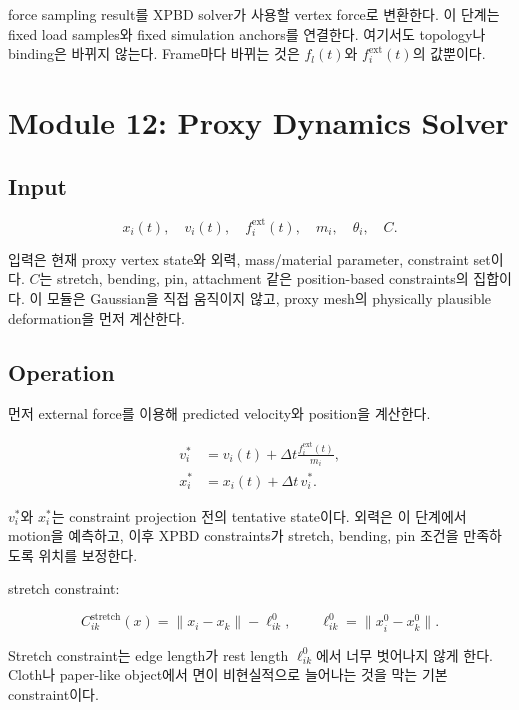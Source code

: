 \documentclass[11pt,a4paper]{article}
\begin{document}
force sampling result를 XPBD solver가 사용할 vertex force로 변환한다. 이 단계는 fixed load samples와 fixed simulation anchors를 연결한다.
여기서도 topology나 binding은 바뀌지 않는다.
Frame마다 바뀌는 것은 $f_l(t)$와 $f_i^{\mathrm{ext}}(t)$의 값뿐이다.

\section{Module 12: Proxy Dynamics Solver}

\subsection*{Input}

\begin{equation}
x_i(t),\quad v_i(t),\quad f_i^{\mathrm{ext}}(t),\quad m_i,\quad \theta_i,\quad C.
\end{equation}

입력은 현재 proxy vertex state와 외력, mass/material parameter, constraint set이다.
$C$는 stretch, bending, pin, attachment 같은 position-based constraints의 집합이다.
이 모듈은 Gaussian을 직접 움직이지 않고, proxy mesh의 physically plausible deformation을 먼저 계산한다.

\subsection*{Operation}

먼저 external force를 이용해 predicted velocity와 position을 계산한다.

\begin{align}
v_i^*&=v_i(t)+\Delta t\frac{f_i^{\mathrm{ext}}(t)}{m_i},\\
x_i^*&=x_i(t)+\Delta t\,v_i^*.
\end{align}

$v_i^*$와 $x_i^*$는 constraint projection 전의 tentative state이다.
외력은 이 단계에서 motion을 예측하고, 이후 XPBD constraints가 stretch, bending, pin 조건을 만족하도록 위치를 보정한다.

stretch constraint:

\begin{equation}
C_{ik}^{\mathrm{stretch}}(x)=\|x_i-x_k\|-\ell_{ik}^0,
\qquad \ell_{ik}^0=\|x_i^0-x_k^0\|.
\end{equation}

Stretch constraint는 edge length가 rest length $\ell_{ik}^0$에서 너무 벗어나지 않게 한다.
Cloth나 paper-like object에서 면이 비현실적으로 늘어나는 것을 막는 기본 constraint이다.
\end{document}
